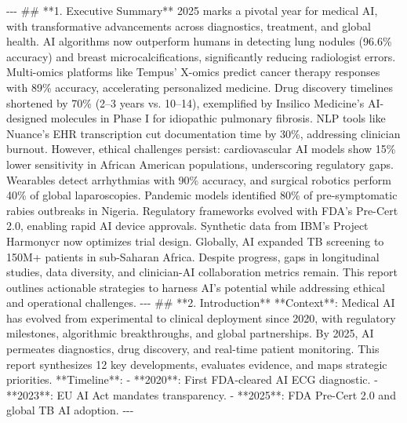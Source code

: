 \documentclass{article}%
\begin{document}
%
{-}{-}{-}\newline%
%
\#\# **1. Executive Summary**\newline%
%
2025 marks a pivotal year for medical AI, with transformative advancements across diagnostics, treatment, and global health. AI algorithms now outperform humans in detecting lung nodules (96.6\% accuracy) and breast microcalcifications, significantly reducing radiologist errors. Multi{-}omics platforms like Tempus’ X{-}omics predict cancer therapy responses with 89\% accuracy, accelerating personalized medicine. Drug discovery timelines shortened by 70\% (2–3 years vs. 10–14), exemplified by Insilico Medicine’s AI{-}designed molecules in Phase I for idiopathic pulmonary fibrosis. NLP tools like Nuance’s EHR transcription cut documentation time by 30\%, addressing clinician burnout. However, ethical challenges persist: cardiovascular AI models show 15\% lower sensitivity in African American populations, underscoring regulatory gaps. Wearables detect arrhythmias with 90\% accuracy, and surgical robotics perform 40\% of global laparoscopies. Pandemic models identified 80\% of pre{-}symptomatic rabies outbreaks in Nigeria. Regulatory frameworks evolved with FDA’s Pre{-}Cert 2.0, enabling rapid AI device approvals. Synthetic data from IBM’s Project Harmonycr now optimizes trial design. Globally, AI expanded TB screening to 150M+ patients in sub{-}Saharan Africa. Despite progress, gaps in longitudinal studies, data diversity, and clinician{-}AI collaboration metrics remain. This report outlines actionable strategies to harness AI’s potential while addressing ethical and operational challenges.\newline%
%
{-}{-}{-}\newline%
%
\#\# **2. Introduction**\newline%
%
**Context**: Medical AI has evolved from experimental to clinical deployment since 2020, with regulatory milestones, algorithmic breakthroughs, and global partnerships. By 2025, AI permeates diagnostics, drug discovery, and real{-}time patient monitoring. This report synthesizes 12 key developments, evaluates evidence, and maps strategic priorities. **Timeline**:\newline%
%
{-} **2020**: First FDA{-}cleared AI ECG diagnostic.\newline%
%
{-} **2023**: EU AI Act mandates transparency.\newline%
%
{-} **2025**: FDA Pre{-}Cert 2.0 and global TB AI adoption.\newline%
%
{-}{-}{-}\newline%
\end{document}
